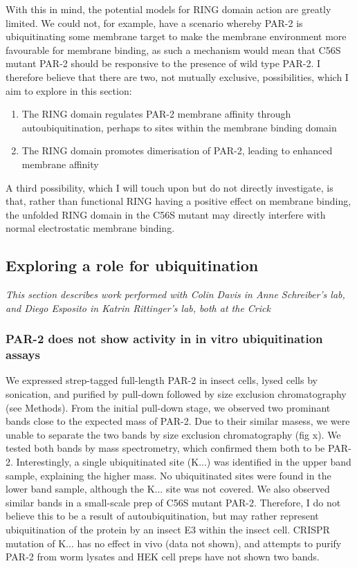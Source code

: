 \documentclass[12pt]{"article"}
\begin{document}
With this in mind, the potential models for RING domain action are greatly limited. We could not, for example, have a scenario whereby PAR-2 is ubiquitinating some membrane target to make the membrane environment more favourable for membrane binding, as such a mechanism would mean that C56S mutant PAR-2 should be responsive to the presence of wild type PAR-2. I therefore believe that there are two, not mutually exclusive, possibilities, which I aim to explore in this section:
\begin{enumerate}
\item The RING domain regulates PAR-2 membrane affinity through autoubiquitination, perhaps to sites within the membrane binding domain
\item The RING domain promotes dimerisation of PAR-2, leading to enhanced membrane affinity
\end{enumerate}

A third possibility, which I will touch upon but do not directly investigate, is that, rather than functional RING having a positive effect on membrane binding, the unfolded RING domain in the C56S mutant may directly interfere with normal electrostatic membrane binding.

\subsection{Exploring a role for ubiquitination}

\textit{This section describes work performed with Colin Davis in Anne Schreiber's lab, and Diego Esposito in Katrin Rittinger's lab, both at the Crick}

\subsubsection{PAR-2 does not show activity in in vitro ubiquitination assays}


We expressed strep-tagged full-length PAR-2 in insect cells, lysed cells by sonication, and purified by pull-down followed by size exclusion chromatography (see Methods). From the initial pull-down stage, we observed two prominant bands close to the expected mass of PAR-2. Due to their similar masess, we were unable to separate the two bands by size exclusion chromatography (fig x). We tested both bands by mass spectrometry, which confirmed them both to be PAR-2. Interestingly, a single ubiquitinated site (K...) was identified in the upper band sample, explaining the higher mass. No ubiquitinated sites were found in the lower band sample, although the K... site was not covered. We also observed similar bands in a small-scale prep of C56S mutant PAR-2. Therefore, I do not believe this to be a result of autoubiquitination, but may rather represent ubiquitination of the protein by an insect E3 within the insect cell. CRISPR mutation of K... has no effect in vivo (data not shown), and attempts to purify PAR-2 from worm lysates and HEK cell preps have not shown two bands.\\
\end{document}
